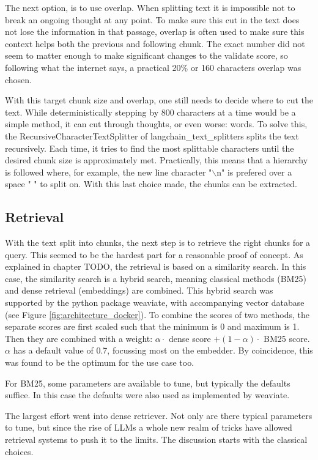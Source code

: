 The next option, is to use overlap. When splitting text it is impossible not to break an ongoing thought at any point. To make sure this cut in the text does not lose the information in that passage, overlap is often used to make sure this context helps both the previous and following chunk. The exact number did not seem to matter enough to make significant changes to the validate score, so following what the internet says, a practical 20\% or 160 characters overlap was chosen.

With this target chunk size and overlap, one still needs to decide where to cut the text. While deterministically stepping by 800 characters at a time would be a simple method, it can cut through thoughts, or even worse: words. To solve this, the RecursiveCharacterTextSplitter of langchain\_text\_splitters splits the text recursively. Each time, it tries to find the most splittable characters until the desired chunk size is approximately met. Practically, this means that a hierarchy is followed where, for example, the new line character "$\backslash$n" is prefered over a space " " to split on. With this last choice made, the chunks can be extracted.

\subsection{Retrieval}
With the text split into chunks, the next step is to retrieve the right chunks for a query. This seemed to be the hardest part for a reasonable proof of concept. As explained in chapter TODO, the retrieval is based on a similarity search. In this case, the similarity search is a hybrid search, meaning classical methods (BM25) and dense retrieval (embeddings) are combined. This hybrid search was supported by the python package weaviate, with accompanying vector database (see Figure \ref{fig:architecture_docker}). To combine the scores of two methods, the separate scores are first scaled such that the minimum is 0 and maximum is 1. Then they are combined with a weight: $\alpha \cdot $ dense score $ + (1-\alpha) \cdot $ BM25 score. $\alpha$ has a default value of 0.7, focussing most on the embedder. By coincidence, this was found to be the optimum for the use case too.

For BM25, some parameters are available to tune, but typically the defaults suffice. In this case the defaults were also used as implemented by weaviate.

The largest effort went into dense retriever. Not only are there typical parameters to tune, but since the rise of LLMs a whole new realm of tricks have allowed retrieval systems to push it to the limits. The discussion starts with the classical choices.

